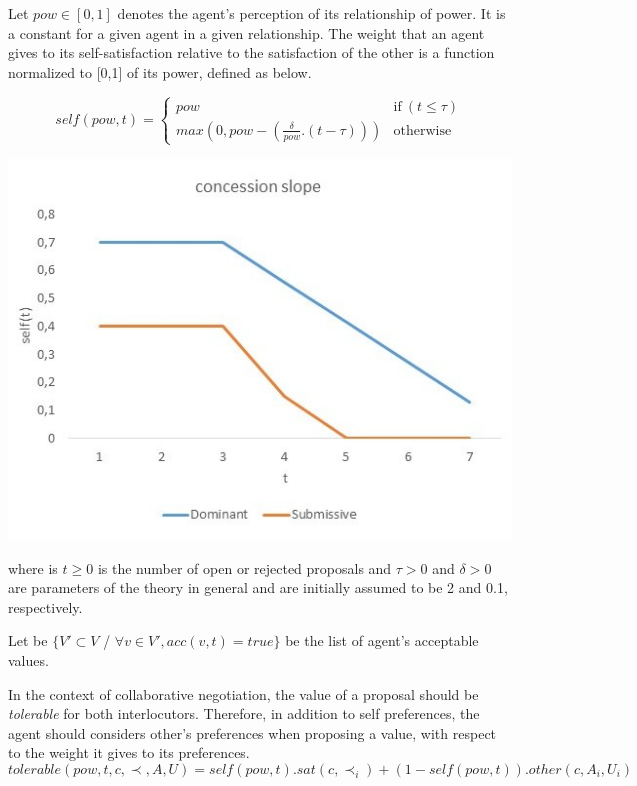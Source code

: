 \documentclass{article}
\begin{document}
		Let  $pow \in [0, 1] $ denotes the agent's perception of its relationship of power. It is a constant for a given agent in a given relationship.
	The weight that an agent gives to its self-satisfaction relative to	the satisfaction of the other is a function normalized to 	[0,1] of its power, defined as below.
	\noindent
	\begin{minipage}{0.5\textwidth}
		\begin{equation}
		self(pow, t) = \left\{\begin{array}{ll}
		pow & \mathrm{if\ } (t \leq \tau)\\
		max(0, pow - (\frac{\delta}{pow} . (t - \tau))) & \mathrm{otherwise}
		\end{array}\right.
		\end{equation}
	\end{minipage}
	 \begin{minipage} {0.5\textwidth}
		\includegraphics[width=\linewidth,keepaspectratio=true]{graphs/slope.jpg}
	 \end{minipage}
	
	where is $t \geq 0$ is the number of open or rejected proposals and $\tau > 0$ and $\delta > 0$
	are parameters of the theory in general and are initially assumed to
	be 2 and 0.1, respectively.
	
	Let be	$\{V' \subset V$ / $\forall v \in V', acc(v,t) = true\}$ be the list of agent's acceptable values. 
	
		In the context of collaborative negotiation, the value of a proposal should be \textit{tolerable} for both interlocutors. Therefore, in addition to self preferences, the agent should considers other's preferences when proposing a value, with respect to the weight it gives to its preferences.
	\begin{equation}
	 tolerable(pow, t, c, \prec, A, U) = self(pow, t) . sat(c, \prec_i)  +  (1 - self(pow, t)) . other(c, A_i, U_i)
	\end{equation}
	
\end{document}
